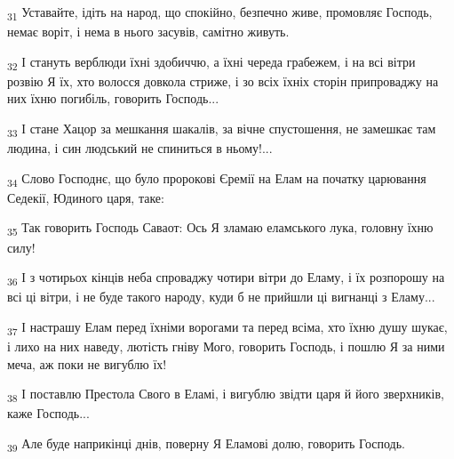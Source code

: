 \begin{tcolorbox}
\textsubscript{31} Уставайте, ідіть на народ, що спокійно, безпечно живе, промовляє Господь, немає воріт, і нема в нього засувів, самітно живуть.
\end{tcolorbox}
\begin{tcolorbox}
\textsubscript{32} І стануть верблюди їхні здобиччю, а їхні череда грабежем, і на всі вітри розвію Я їх, хто волосся довкола стриже, і зо всіх їхніх сторін припроваджу на них їхню погибіль, говорить Господь...
\end{tcolorbox}
\begin{tcolorbox}
\textsubscript{33} І стане Хацор за мешкання шакалів, за вічне спустошення, не замешкає там людина, і син людський не спиниться в ньому!...
\end{tcolorbox}
\begin{tcolorbox}
\textsubscript{34} Слово Господнє, що було пророкові Єремії на Елам на початку царювання Седекії, Юдиного царя, таке:
\end{tcolorbox}
\begin{tcolorbox}
\textsubscript{35} Так говорить Господь Саваот: Ось Я зламаю еламського лука, головну їхню силу!
\end{tcolorbox}
\begin{tcolorbox}
\textsubscript{36} І з чотирьох кінців неба спроваджу чотири вітри до Еламу, і їх розпорошу на всі ці вітри, і не буде такого народу, куди б не прийшли ці вигнанці з Еламу...
\end{tcolorbox}
\begin{tcolorbox}
\textsubscript{37} І настрашу Елам перед їхніми ворогами та перед всіма, хто їхню душу шукає, і лихо на них наведу, лютість гніву Мого, говорить Господь, і пошлю Я за ними меча, аж поки не вигублю їх!
\end{tcolorbox}
\begin{tcolorbox}
\textsubscript{38} І поставлю Престола Свого в Еламі, і вигублю звідти царя й його зверхників, каже Господь...
\end{tcolorbox}
\begin{tcolorbox}
\textsubscript{39} Але буде наприкінці днів, поверну Я Еламові долю, говорить Господь.
\end{tcolorbox}
